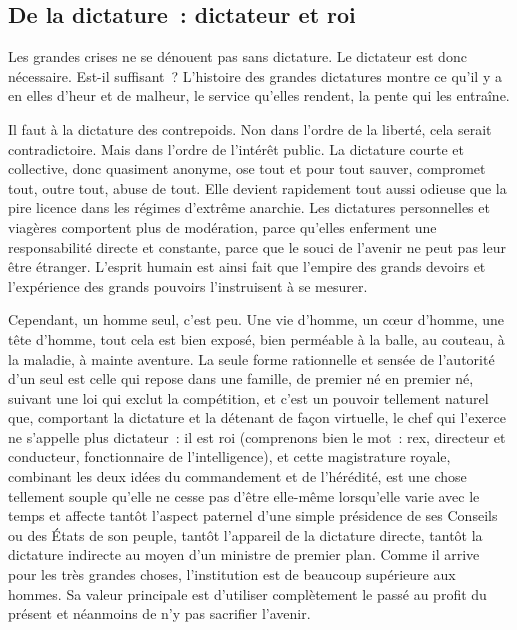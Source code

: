 \documentclass[french,twoside]{book} %
\begin{document}
\subsection[De la dictature : dictateur et roi]{De la dictature : dictateur et roi}
\noindent Les grandes crises ne se dénouent pas sans dictature. Le dictateur est donc nécessaire. Est-il suffisant ? L’histoire des grandes dictatures montre ce qu’il y a en elles d’heur et de malheur, le service qu’elles rendent, la pente qui les entraîne.\par
Il faut à la dictature des contrepoids. Non dans l’ordre de la liberté, cela serait contradictoire. Mais dans l’ordre de l’intérêt public. La dictature courte et collective, donc quasiment anonyme, ose tout et pour tout sauver, compromet tout, outre tout, abuse de tout. Elle devient rapidement tout aussi odieuse que la pire licence dans les régimes d’extrême anarchie. Les dictatures personnelles et viagères comportent plus de modération, parce qu’elles enferment une responsabilité directe et constante, parce que le souci de l’avenir ne peut pas leur être étranger. L’esprit humain est ainsi fait que l’empire des grands devoirs et l’expérience des grands pouvoirs l’instruisent à se mesurer.\par
Cependant, un homme seul, c’est peu. Une vie d’homme, un cœur d’homme, une tête d’homme, tout cela est bien exposé, bien perméable à la balle, au couteau, à la maladie, à mainte aventure. La seule forme rationnelle et sensée de l’autorité d’un seul est celle qui repose dans une famille, de premier né en premier né, suivant une loi qui exclut la compétition, et c’est un pouvoir tellement naturel que, comportant la dictature et la détenant de façon virtuelle, le chef qui l’exerce ne s’appelle plus dictateur : il est roi (comprenons bien le mot : rex, directeur et conducteur, fonctionnaire de l’intelligence), et cette magistrature royale, combinant les deux idées du commandement et de l’hérédité, est une chose tellement souple qu’elle ne cesse pas d’être elle-même lorsqu’elle varie avec le temps et affecte tantôt l’aspect paternel d’une simple présidence de ses Conseils ou des États de son peuple, tantôt l’appareil de la dictature directe, tantôt la dictature indirecte au moyen d’un ministre de premier plan. Comme il arrive pour les très grandes choses, l’institution est de beaucoup supérieure aux hommes. Sa valeur principale est d’utiliser complètement le passé au profit du présent et néanmoins de n’y pas sacrifier l’avenir.\par
\end{document}

